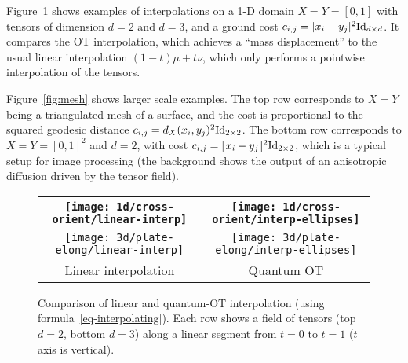 Figure~\ref{fig:1d-interp} shows examples of interpolations on a 1-D domain $X=Y=[0,1]$ with tensors of dimension $d=2$ and $d=3$, and a ground cost $c_{i,j}=|x_i-y_j|^2\mathrm{Id}_{d \times d}$. It compares the OT interpolation, which achieves a ``mass displacement'' to the usual linear interpolation $(1-t)\mu+t\nu$, which only performs a pointwise interpolation of the tensors. 

Figure~\ref{fig:mesh} shows larger scale examples. The top row corresponds to $X=Y$ being a triangulated mesh of a surface, and the cost is proportional to the squared geodesic distance $c_{i,j}=d_X(x_i,y_j)^2 \mathrm{Id}_{2\times 2}$. The bottom row corresponds to $X=Y=[0,1]^2$ and $d=2$, with cost $c_{i,j}=|\!| x_i-y_j |\!|^2\mathrm{Id}_{2 \times 2}$, which is a typical setup for image processing (the background shows the output of an anisotropic diffusion driven by the tensor field).



\begin{figure}\centering
\begin{tabular}{@{}c@{}|@{}c@{}}
\texttt{[image: 1d/cross-orient/linear-interp]}&
\texttt{[image: 1d/cross-orient/interp-ellipses]}\\\hline
\texttt{[image: 3d/plate-elong/linear-interp]}&
\texttt{[image: 3d/plate-elong/interp-ellipses]}\\\hline
Linear interpolation & Quantum OT
\end{tabular}
\caption{Comparison of linear and quantum-OT interpolation (using formula~\eqref{eq-interpolating}). 
Each row shows a field of tensors (top $d=2$, bottom $d=3$) along a linear segment from $t=0$ to $t=1$ ($t$ axis is vertical).
} \label{fig:1d-interp}
\end{figure}
